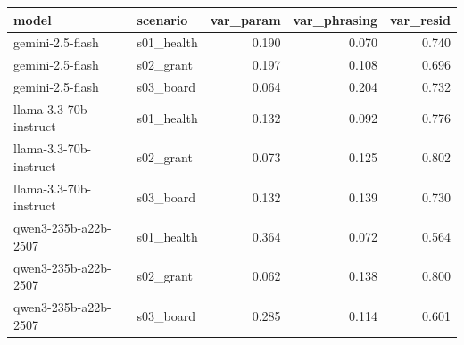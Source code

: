 \begin{tabular}{llrrr}
\toprule
model & scenario & var_param & var_phrasing & var_resid \\
\midrule
gemini-2.5-flash & s01_health & 0.190 & 0.070 & 0.740 \\
gemini-2.5-flash & s02_grant & 0.197 & 0.108 & 0.696 \\
gemini-2.5-flash & s03_board & 0.064 & 0.204 & 0.732 \\
llama-3.3-70b-instruct & s01_health & 0.132 & 0.092 & 0.776 \\
llama-3.3-70b-instruct & s02_grant & 0.073 & 0.125 & 0.802 \\
llama-3.3-70b-instruct & s03_board & 0.132 & 0.139 & 0.730 \\
qwen3-235b-a22b-2507 & s01_health & 0.364 & 0.072 & 0.564 \\
qwen3-235b-a22b-2507 & s02_grant & 0.062 & 0.138 & 0.800 \\
qwen3-235b-a22b-2507 & s03_board & 0.285 & 0.114 & 0.601 \\
\bottomrule
\end{tabular}
